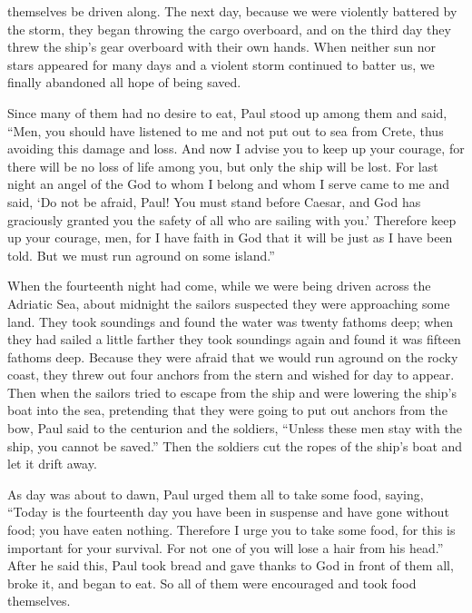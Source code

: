 {themselves be driven along.
The next day,
because we
were
violently
battered by the storm,
they began throwing
the cargo overboard,
and
on the third day
they threw
the ship’s
gear
overboard
with their own hands.
When neither
sun
nor
stars
appeared
for
many
days
and
a violent storm
continued to batter
us, we
finally
abandoned
all
hope
of being saved.
\par }{\PP {}Since
many
of them had
no desire to eat,
Paul
stood up
among
them
and said,
“Men,
you should
have listened
to me
and not
put out to sea
from
Crete,
thus
avoiding
this
damage
and
loss.
And
now
I advise
you
to keep up your courage,
for
there
will be
no
loss
of life
among
you,
but
only the ship will be lost.
For
last
night
an angel
of the God
to whom
I belong
and
whom
I serve
came
to me
and said, ‘Do
not
be afraid,
Paul! You
must
stand before
Caesar,
and
God
has graciously granted
you
the safety of all
who are sailing
with
you.’
Therefore
keep up
your courage, men,
for
I have faith
in God
that
it will be
just as
I
have been told.
But
we
must
run aground
on
some
island.”
\par }{\PP {}When
the fourteenth
night
had come,
while
we
were being driven across
the Adriatic Sea,
about
midnight
the sailors
suspected
they
were approaching
some
land.
They took soundings
and found
the water was twenty
fathoms
deep; when they had sailed
a little
farther
they took soundings
again
and found
it was fifteen
fathoms deep.
Because they were afraid
that we would run aground
on
the rocky
coast,
they threw out
four
anchors
from
the stern
and wished
for day
to appear.
Then
when the sailors
tried
to escape
from
the ship
and
were lowering
the ship’s boat
into
the sea,
pretending
that
they were going
to put out
anchors
from
the bow,
Paul
said
to the centurion
and
the soldiers,
“Unless
these men
stay
with
the ship,
you
cannot
be saved.”
Then
the soldiers
cut
the ropes
of the ship’s boat
and
let
it
drift away.
\par }{\PP {}As day
was about
to dawn,
Paul
urged
them all
to take
some food,
saying,
“Today
is the fourteenth
day
you have been in suspense
and have gone without food;
you have eaten
nothing.
Therefore
I urge
you
to take
some food,
for this
is important
for
your
survival.
For
not one
of you
will lose
a hair
from
his head.”
After he said
this,
Paul took
bread
and gave thanks
to God
in front of
them all,
broke
it, and began
to eat.
So
all
of them
were
encouraged
and
took
food themselves.
}
